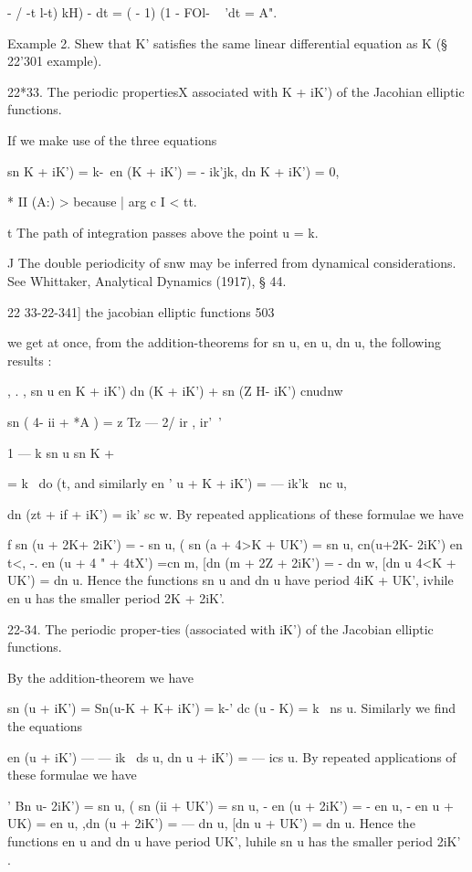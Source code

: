 - / -t l-t) kH) - dt = ( - 1) (1 - FOl- ~ 'dt = A".

Example 2. Shew that K' satisfies the same linear differential
equation as K (§ 22'301 example).

22*33. The periodic propertiesX associated with K + iK') of the
Jacohian elliptic functions.

If we make use of the three equations

sn K + iK') = k-\ en (K + iK') = - ik'jk, dn K + iK') = 0,

* II (A:) > because | arg c I < tt.

t The path of integration passes above the point u = k.

J The double periodicity of snw may be inferred from dynamical
considerations. See Whittaker, Analytical Dynamics (1917), § 44.



22 33-22-341] the jacobian elliptic functions 503

we get at once, from the addition-theorems for sn u, en u, dn u, the
following results :

, . , sn u en K + iK') dn (K + iK') + sn (Z H- iK') cnudnw

sn ( 4- ii + *A ) = z Tz — 2/ ir , ir'\ '

  1 — k sn u sn K +%

= k~ do (t, and similarly en ' u + K + iK') = — ik'k~ nc u,

dn (zt + if + iK') = ik' sc w. By repeated applications of these
formulae we have

f sn (u + 2K+ 2iK') = - sn u, ( sn (a + 4>K + UK') = sn u, cn(u+2K-
2iK') en t<, -. en (u + 4 " + 4tX') =cn m, [dn (m + 2Z + 2iK') = - dn
w, [dn u 4<K + UK') = dn u. Hence the functions sn u and dn u have
period 4iK + UK', ivhile en u has the smaller period 2K + 2iK'.

22-34. The periodic proper-ties (associated with iK') of the Jacobian
elliptic functions.

By the addition-theorem we have

sn (u + iK') = Sn(u-K + K+ iK') = k-' dc (u - K) = k~ ns u. Similarly
we find the equations

en (u + iK') — — ik~ ds u, dn u + iK') = — ics u. By repeated
applications of these formulae we have

' Bn u- 2iK') = sn u, ( sn (ii + UK') = sn u, - en (u + 2iK') = - en
u, - en u + UK) = en u, ,dn (u + 2iK') = — dn u, [dn u + UK') = dn u.
Hence the functions en u and dn u have period UK', luhile sn u has the
smaller period 2iK' .

